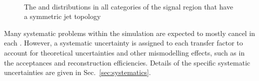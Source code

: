 \begin{figure}
    \begin{center}
         ~~
         \\
        \caption{The \HT and \nj distributions in all categories of
        the signal region that have a symmetric jet topology}
        \label{fig:distribution_signal}
    \end{center}
\end{figure}

Many systematic problems within the simulation are expected to mostly
cancel in each \TF. However, a systematic uncertainty is assigned to
each transfer factor to account for theoretical uncertainties and
other mismodelling effects, such as in the acceptances and
reconstruction efficiencies. Details of the specific systematic
uncertainties are given in Sec.~\ref{sec:systematics}.

